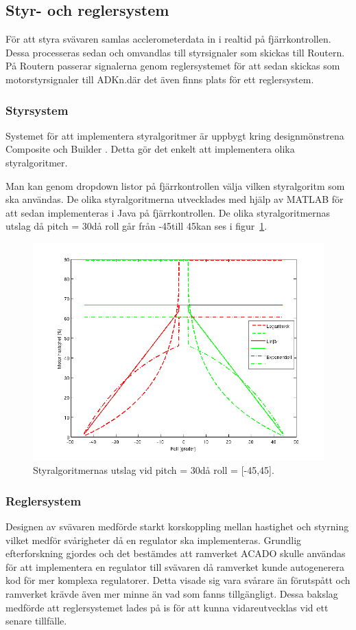 \subsection{Styr- och reglersystem}
\label{subsec:styr och regler}
För att styra svävaren samlas acclerometerdata in i realtid på fjärrkontrollen.
Dessa processeras sedan och omvandlas till styrsignaler som skickas till
Routern. På Routern passerar signalerna genom reglersystemet för att sedan
skickas som motorstyrsignaler till ADKn.där det även finns plats för ett
reglersystem.

\subsubsection{Styrsystem}
Systemet för att implementera styralgoritmer är uppbygt kring designmönstrena
Composite \cite{Composite pattern} och Builder \cite{Builder pattern}. Detta gör
det enkelt att implementera olika styralgoritmer.

Man kan genom dropdown listor på fjärrkontrollen välja vilken styralgoritm som
ska användas. De olika styralgoritmerna utvecklades med hjälp av MATLAB för att
sedan implementeras i Java på fjärrkontrollen. De olika styralgoritmernas utslag
då pitch = 30\degree  då roll går från -45\degree till 45\degree  kan ses i
figur~\ref{fig:styralgoritmer}.

\begin{figure}[htbp!]
\centering
\includegraphics[width=12cm]{../../includes/figures/Styralgoritmer}
\caption{Styralgoritmernas utslag vid pitch = 30\degree då roll = [-45,45].}
\label{fig:styralgoritmer}
\end{figure}

\subsubsection{Reglersystem}
Designen av svävaren medförde starkt korskoppling mellan hastighet och
styrning vilket medför svårigheter då en regulator ska implementeras.
Grundlig efterforskning gjordes och det bestämdes att ramverket ACADO
\cite{ACADO} skulle användas för att implementera en regulator till svävaren då
ramverket kunde autogenerera kod för mer komplexa regulatorer. Detta visade sig
vara svårare än förutspått och ramverket krävde även mer minne än vad som fanns
tillgängligt. Dessa bakslag medförde att reglersystemet lades på is för att
kunna vidareutvecklas vid ett senare tillfälle.

